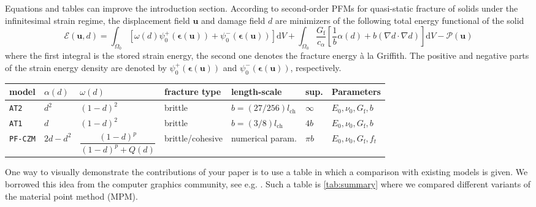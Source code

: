 \documentclass[authoryear,3p,times,preprint,review,fleqn]{elsarticle}
\newcommand{\bfepsilon}{\boldsymbol{\epsilon}}
\newcommand{\bfu}{\boldsymbol{u}}
\newcommand{\td}{\text{d}}
\numberwithin{equation}{section}
\theoremstyle{remark}
\begin{document}
\begin{MyBox}[label={algo-static-FEM}]
{Equations and tables can improve the introduction section.}
According to second-order PFMs for quasi-static fracture of solids under the infinitesimal strain regime, the displacement field $\bfu$ and damage field $d$ are minimizers of the following total energy functional of the solid 
\begin{equation*}
  \mathscr{E} (\bfu, d) 
    = \int_{\varOmega_{0}} \left[\omega(d)\psi_{0}^+(\bfepsilon (\bfu)) + \psi_{0}^-(\bfepsilon (\bfu)) \right]\td V
    + \int_{\varOmega_{0}}  \frac{G_\text{f}}{c_\alpha} \left[ \frac{1}{b} \alpha(d)
    + b \left( \nabla d \cdot \nabla d \right) \right] \td V
    - \mathscr{P} (\bfu)
\label{eq:3}
\end{equation*}
where the first integral is the stored strain energy, the second one denotes the fracture energy \`a la Griffith. The positive and negative parts of the strain energy density are denoted by $\psi_{0}^+(\bfepsilon (\bfu))$ and $\psi_{0}^-(\bfepsilon (\bfu))$, respectively.\\

 \begin{tabularx}{\textwidth}{lllllll}
   \toprule
 model & $\alpha(d)$ &  $\omega(d)$    & fracture type & length-scale & sup.  & Parameters\\
   \midrule     
  \texttt{AT2} & $d^2$  & $(1 - d)^{2}$  & brittle  & $b=(27/256) l_{\text{ch}}$ & $\infty$ & $E_0,\nu_0,G_\text{f},b$ \\
  \texttt{AT1} & $d$    & $(1 - d)^{2}$ &  brittle  & $b=(3/8) l_{\text{ch}}$ & $4b$  & $E_0,\nu_0,G_\text{f},b$\\
  \texttt{PF-CZM} & $2d-d^2$ & $\dfrac{(1 - d)^p}{(1 - d)^p + Q(d)}$ &  brittle/cohesive  & numerical param. & $\pi b$  & $E_0,\nu_0,G_\text{f},f_t$\\
   \bottomrule
 \end{tabularx}%
\end{MyBox}

One way to visually demonstrate the contributions of your paper is to use a table in which a comparison with existing models is given. We borrowed this idea from the computer graphics community, see e.g. \cite{Stomakhin:TG2013a}. Such a table is \cref{tab:summary} where we compared different variants of the material point method (MPM).
\end{document}
